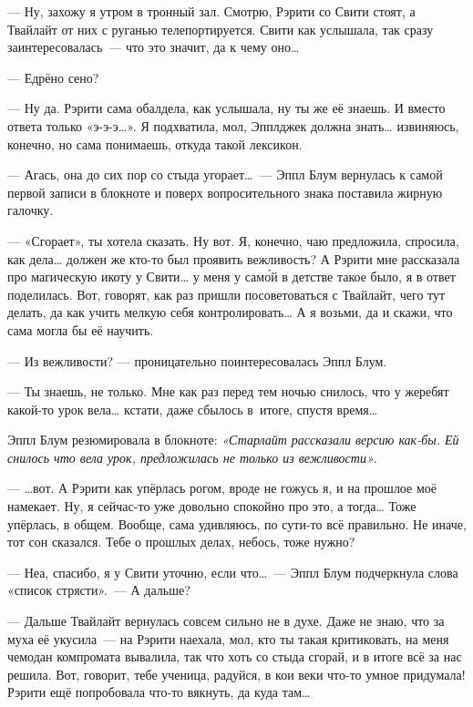 \documentclass[fontsize=11pt,a5paper,titlepage=firstcover]{scrbook}
\begin{document}
--- Ну, захожу я утром в тронный зал. Смотрю, Рэрити со Свити стоят, а Твайлайт от них с руганью телепортируется. Свити как услышала, так сразу заинтересовалась~--- что это значит, да к чему оно{\ldots}

--- Едрёно сено?

--- Ну да. Рэрити сама обалдела, как услышала, ну ты же её знаешь. И вместо ответа только «э-э-э{\ldots}». Я подхватила, мол, Эпплджек должна знать{\ldots} извиняюсь, конечно, но сама понимаешь, откуда такой лексикон.

--- Агась, она до сих пор со стыда угорает{\ldots}~--- Эппл Блум вернулась к самой первой записи в блокноте и поверх вопросительного знака поставила жирную галочку.

--- «Сгорает», ты хотела сказать. Ну вот. Я, конечно, чаю предложила, спросила, как дела{\ldots} должен же кто-то был проявить вежливость? А Рэрити мне рассказала про магическую икоту у Свити{\ldots} у меня у само́й в детстве такое было, я в ответ поделилась. Вот, говорят, как раз пришли посоветоваться с Твайлайт, чего тут делать, да как учить мелкую себя контролировать{\ldots} А я возьми, да и скажи, что сама могла бы её научить.

--- Из вежливости? --- проницательно поинтересовалась Эппл Блум.

--- Ты знаешь, не только. Мне как раз перед тем ночью снилось, что у жеребят какой-то урок вела{\ldots} кстати, даже сбылось в~итоге, спустя время{\ldots}

Эппл Блум резюмировала в блокноте: \emph{«Старлайт рассказали версию как-бы. Ей снилось что вела урок, предложилась не только из вежливости»}.

--- {\ldots}вот. А Рэрити как упёрлась рогом, вроде не гожусь я, и на прошлое моё намекает. Ну, я сейчас-то уже довольно спокойно про это, а тогда{\ldots} Тоже упёрлась, в общем. Вообще, сама удивляюсь, по сути-то всё правильно. Не иначе, тот сон сказался. Тебе о прошлых делах, небось, тоже нужно?

--- Неа, спасибо, я у Свити уточню, если что{\ldots}~--- Эппл Блум подчеркнула слова «список стрясти».~--- А дальше?

--- Дальше Твайлайт вернулась совсем сильно не в духе. Даже не знаю, что за муха её укусила~--- на Рэрити наехала, мол, кто ты такая критиковать, на меня чемодан компромата вывалила, так что хоть со стыда сгорай, и в итоге всё за нас решила. Вот, говорит, тебе ученица, радуйся, в кои веки что-то умное придумала! Рэрити ещё попробовала что-то вякнуть, да куда там{\ldots}
\end{document}
